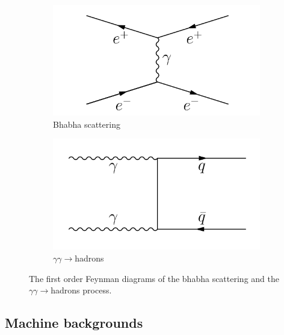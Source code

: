 \begin{figure}[h!]
\centering
\begin{subfigure}[b]{0.35\textwidth}
\includegraphics[width=\textwidth]{Figures/bhabha_scattering.pdf}
\caption{Bhabha scattering}
\end{subfigure}
\vspace*{0.2cm}
\begin{subfigure}[b]{0.35\textwidth}
\includegraphics[width=\textwidth]{Figures/gammagamma_hadrons.pdf}
\caption{$\gamma\gamma\rightarrow$hadrons}
\end{subfigure}
\caption[Feynman diagrams of bhabha scattering and the $\gamma\gamma\rightarrow$hadrons process.]{The first order Feynman diagrams of the bhabha scattering and the $\gamma\gamma\rightarrow$hadrons process.}
\label{fig:Feynman:bhabha_gammagamma}
\end{figure}

\subsection{Machine backgrounds}
\label{MachineBackgrounds}

